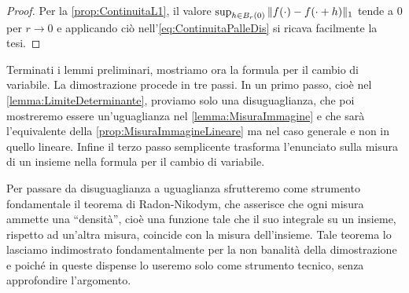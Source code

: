 \begin{proof}
	Per la \cref{prop:ContinuitaL1}, il valore $\sup_{h\in B_r(0)} \Vert f(\cdot)-f(\cdot+h)\Vert_1$ tende a $0$ per $r\to 0$ e applicando ciò nell'\cref{eq:ContinuitaPalleDis} si ricava facilmente la tesi.
\end{proof}

Terminati i lemmi preliminari, mostriamo ora la formula per il cambio di variabile. La dimostrazione procede in tre passi. 
In un primo passo, cioè nel \cref{lemma:LimiteDeterminante}, proviamo solo una disuguaglianza, che poi mostreremo essere un'uguaglianza nel \cref{lemma:MisuraImmagine} e che sarà l'equivalente della \cref{prop:MisuraImmagineLineare} ma nel caso generale e non in quello lineare. Infine il terzo passo semplicente trasforma l'enunciato sulla misura di un insieme nella formula per il cambio di variabile.

Per passare da disuguaglianza a uguaglianza sfrutteremo come strumento fondamentale il teorema di Radon-Nikodym, che asserisce che ogni misura ammette una ``densità'', cioè una funzione tale che il suo integrale su un insieme, rispetto ad un'altra misura, coincide con la misura dell'insieme.
Tale teorema lo lasciamo indimostrato fondamentalmente per la non banalità della dimostrazione e poiché in queste dispense lo useremo solo come strumento tecnico, senza approfondire l'argomento.

